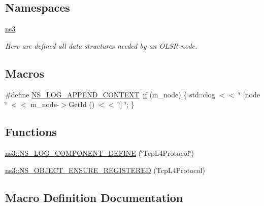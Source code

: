 \subsection*{Namespaces}
\begin{DoxyCompactItemize}
\item 
 \hyperlink{namespacens3}{ns3}
\begin{DoxyCompactList}\small\item\em Here are defined all data structures needed by an O\+L\+SR node. \end{DoxyCompactList}\end{DoxyCompactItemize}
\subsection*{Macros}
\begin{DoxyCompactItemize}
\item 
\#define \hyperlink{tcp-l4-protocol_8cc_abe50035652d407c40bdaef78214c4955}{N\+S\+\_\+\+L\+O\+G\+\_\+\+A\+P\+P\+E\+N\+D\+\_\+\+C\+O\+N\+T\+E\+XT}~\hyperlink{loss__OH__large__cities__urban_8m_ac77b6cfa3068152087725fe54b4ae8c8}{if} (m\+\_\+node) \{ std\+::clog $<$$<$ \char`\"{} \mbox{[}node \char`\"{} $<$$<$ m\+\_\+node-\/$>$Get\+Id () $<$$<$ \char`\"{}\mbox{]} \char`\"{}; \}
\end{DoxyCompactItemize}
\subsection*{Functions}
\begin{DoxyCompactItemize}
\item 
\hyperlink{namespacens3_ac6857ba76975055e63c61ed6bfbc1dce}{ns3\+::\+N\+S\+\_\+\+L\+O\+G\+\_\+\+C\+O\+M\+P\+O\+N\+E\+N\+T\+\_\+\+D\+E\+F\+I\+NE} (\char`\"{}Tcp\+L4\+Protocol\char`\"{})
\item 
\hyperlink{namespacens3_a14b03917841f730662f6044f3432aafd}{ns3\+::\+N\+S\+\_\+\+O\+B\+J\+E\+C\+T\+\_\+\+E\+N\+S\+U\+R\+E\+\_\+\+R\+E\+G\+I\+S\+T\+E\+R\+ED} (Tcp\+L4\+Protocol)
\end{DoxyCompactItemize}


\subsection{Macro Definition Documentation}
